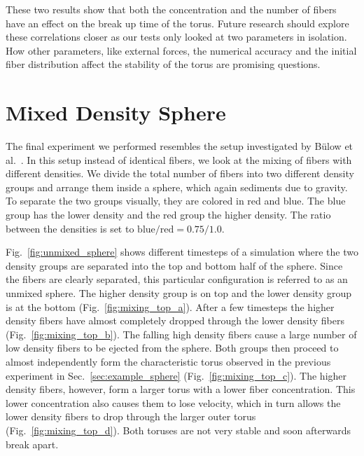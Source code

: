 These two results show that both the concentration and the number of fibers have an effect on the break up time of the torus. Future research should explore these correlations closer as our tests only looked at two parameters in isolation. How other parameters, like external forces, the numerical accuracy and the initial fiber distribution affect the stability of the torus are promising questions.

\section{Mixed Density Sphere}
\label{sec:mixed_density_sphere}

The final experiment we performed resembles the setup investigated by Bülow et al.~\cite{Bulow2015}. In this setup instead of identical fibers, we look at the mixing of fibers with different densities. We divide the total number of fibers into two different density groups and arrange them inside a sphere, which again sediments due to gravity. To separate the two groups visually, they are colored in red and blue. The blue group has the lower density and the red group the higher density. The ratio between the densities is set to $\text{blue} / \text{red}= 0.75 / 1.0$.

Fig.~\ref{fig:unmixed_sphere} shows different timesteps of a simulation where the two density groups are separated into the top and bottom half of the sphere. Since the fibers are clearly separated, this particular configuration is referred to as an unmixed sphere. The higher density group is on top and the lower density group is at the bottom (Fig.~\ref{fig:mixing_top_a}). After a few timesteps the higher density fibers have almost completely dropped through the lower density fibers (Fig.~\ref{fig:mixing_top_b}). The falling high density fibers cause a large number of low density fibers to be ejected from the sphere. Both groups then proceed to almost independently form the characteristic torus observed in the previous experiment in Sec.~\ref{sec:example_sphere} (Fig.~\ref{fig:mixing_top_c}). The higher density fibers, however, form a larger torus with a lower fiber concentration. This lower concentration also causes them to lose velocity, which in turn allows the lower density fibers to drop through the larger outer torus (Fig.~\ref{fig:mixing_top_d}). Both toruses are not very stable and soon afterwards break apart.

